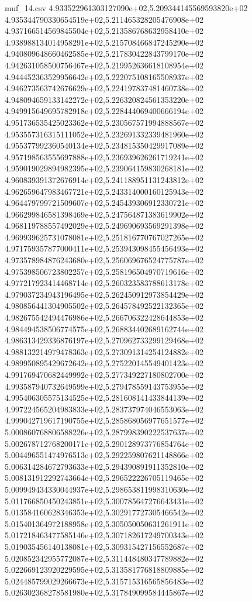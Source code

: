 \begin{filecontents*}{muf_14.csv}
4.933522961303127090e+02,5.209344145569593820e+02
4.935344790330654519e+02,5.211465328205476908e+02
4.937166514569845504e+02,5.213586768632958410e+02
4.938988134014958291e+02,5.215708466847245290e+02
4.940809648660462585e+02,5.217830422843799170e+02
4.942631058500756467e+02,5.219952636618108954e+02
4.944452363529956642e+02,5.222075108165508937e+02
4.946273563742676629e+02,5.224197837481460738e+02
4.948094659133142272e+02,5.226320824561353220e+02
4.949915649695782918e+02,5.228444069400666194e+02
4.951736535425023362e+02,5.230567571994888567e+02
4.953557316315111052e+02,5.232691332339481960e+02
4.955377992360540134e+02,5.234815350429917089e+02
4.957198563555697888e+02,5.236939626261719241e+02
4.959019029894982395e+02,5.239064159830268181e+02
4.960839391372676914e+02,5.241188951131243812e+02
4.962659647983467721e+02,5.243314000160125943e+02
4.964479799721509607e+02,5.245439306912330721e+02
4.966299846581398469e+02,5.247564871383619902e+02
4.968119788557492029e+02,5.249690693569291398e+02
4.969939625731078081e+02,5.251816770767027265e+02
4.971759357877000411e+02,5.253943098455456493e+02
4.973578984876243680e+02,5.256069676524775787e+02
4.975398506723802257e+02,5.258196504970719616e+02
4.977217923414468714e+02,5.260323583788613178e+02
4.979037234943196495e+02,5.262450912973854429e+02
4.980856441304905502e+02,5.264578492522132365e+02
4.982675542494476986e+02,5.266706322428644853e+02
4.984494538506774575e+02,5.268834402689162744e+02
4.986313429336876197e+02,5.270962733299129468e+02
4.988132214979478363e+02,5.273091314254124882e+02
4.989950895429672642e+02,5.275220145549401423e+02
4.991769470682449992e+02,5.277349227180802700e+02
4.993587940732649599e+02,5.279478559143753955e+02
4.995406305575134525e+02,5.281608141433844139e+02
4.997224565204983833e+02,5.283737974046553063e+02
4.999042719617190755e+02,5.285868056977651577e+02
5.000860768806588226e+02,5.287998390222537637e+02
5.002678712768200171e+02,5.290128973776854764e+02
5.004496551474976513e+02,5.292259807621148866e+02
5.006314284672793633e+02,5.294390891911352810e+02
5.008131912292743664e+02,5.296522226705119465e+02
5.009949434330044937e+02,5.298653811998310630e+02
5.011766850450243851e+02,5.300785647276643431e+02
5.013584160628346353e+02,5.302917727305466542e+02
5.015401364972188958e+02,5.305050050631261911e+02
5.017218463477585146e+02,5.307182617249700343e+02
5.019035456140138081e+02,5.309315427156552687e+02
5.020852342955772087e+02,5.311448480347789882e+02
5.022669123920229595e+02,5.313581776818809885e+02
5.024485799029266673e+02,5.315715316565856483e+02
5.026302368278581980e+02,5.317849099584445867e+02

\end{filecontents*}
